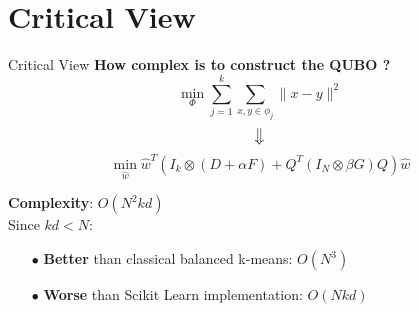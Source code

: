 \section{Critical View}
	\begin{frame}[allowframebreaks]{Critical View}
		\textbf{How complex is to construct the QUBO ?}
		$$\min _{\Phi} \sum_{j=1}^{k} \sum_{x, y \in \phi_{j}}\|x-y\|^{2}$$ $$\big\Downarrow$$ $$\min _{\hat{w}} \hat{w}^{T}\left(I_{k} \otimes(D+\alpha F)+Q^{T}\left(I_{N} \otimes \beta G\right) Q\right) \hat{w}$$ 
		
		\textbf{Complexity}: $O(N^2kd)$ \\
		Since $kd < N$:
		\begin{itemize}
			\item[$\bullet$] \textbf{Better} than classical balanced k-means: $O(N^3)$
			\item[$\bullet$] \textbf{Worse} than Scikit Learn implementation: $O(Nkd)$  
		\end{itemize}
		
		

\end{frame}
